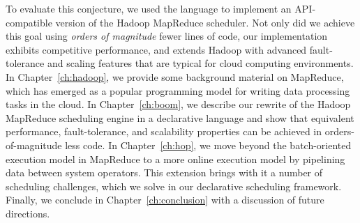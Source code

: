 To evaluate this conjecture, we used the \OVERLOG language to implement an
API-compatible version of the Hadoop MapReduce scheduler.  Not only did we
achieve this goal using {\em orders of magnitude} fewer lines of code, our
implementation exhibits competitive performance, and extends Hadoop with
advanced fault-tolerance and scaling features that are typical for cloud
computing environments.  In Chapter~\ref{ch:hadoop}, we provide some background
material on MapReduce, which has emerged as a popular programming model for
writing data processing tasks in the cloud.  In Chapter~\ref{ch:boom}, we describe
our rewrite of the Hadoop MapReduce scheduling engine in a declarative language
and show that equivalent performance, fault-tolerance, and scalability
properties can be achieved in orders-of-magnitude less code.  In
Chapter~\ref{ch:hop}, we move beyond the batch-oriented execution model in
MapReduce to a more online execution model by pipelining data between system
operators.  This extension brings with it a number of scheduling challenges,
which we solve in our declarative scheduling framework.  Finally, we conclude
in Chapter~\ref{ch:conclusion} with a discussion of future directions.




